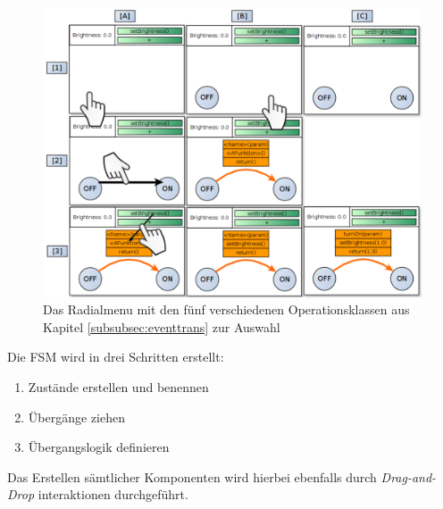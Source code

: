 \begin{figure}[h]
  \centering
  \includegraphics[width=1\textwidth]{bilder/chapter4/chapter4_3/createFsm.pdf}
  \caption{Das Radialmenu mit den fünf verschiedenen Operationsklassen aus Kapitel \ref{subsubsec:eventtrans} zur Auswahl}
  \label{fig:connectNodesInteraction}
\end{figure}

Die \ac{FSM} wird in drei Schritten erstellt:
\begin{enumerate}
    \item Zustände erstellen und benennen
    \item Übergänge ziehen
    \item Übergangslogik definieren
\end{enumerate}
Das Erstellen sämtlicher Komponenten wird hierbei ebenfalls durch \textit{Drag-and-Drop} interaktionen durchgeführt. 

